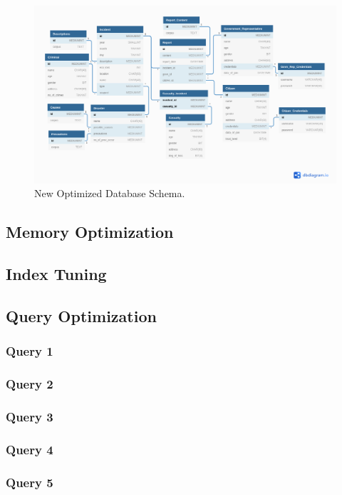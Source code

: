 \begin{figure}[H]
    \centering
    \includegraphics[width=\textwidth]{images/stats/optimized-schema.png}
    \caption{New Optimized Database Schema.}
    \label{fig:db-schema}
\end{figure}

\subsection{Memory Optimization}

\subsection{Index Tuning}

\subsection{Query Optimization}
\subsubsection{Query 1}
\subsubsection{Query 2}
\subsubsection{Query 3}
\subsubsection{Query 4}
\subsubsection{Query 5}
